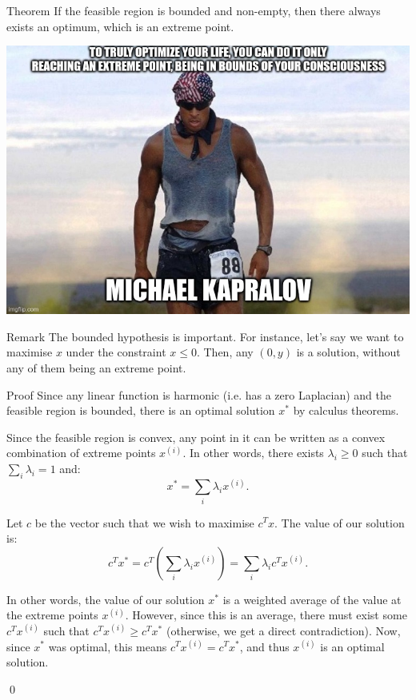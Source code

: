 \documentclass[a4paper]{article}
\begin{document}
\begin{parag}{Theorem}
    If the feasible region is bounded and non-empty, then there always exists an optimum, which is an extreme point.

    \begin{center}
        \includegraphics[width=\textwidth]{9hjhow.jpg}
    \end{center}


    \begin{subparag}{Remark}
        The bounded hypothesis is important. For instance, let's say we want to maximise $x$ under the constraint $x \leq 0$. Then, any $\left(0, y\right)$ is a solution, without any of them being an extreme point.
    \end{subparag}

    \begin{subparag}{Proof}
        Since any linear function is harmonic (i.e. has a zero Laplacian) and the feasible region is bounded, there is an optimal solution $x^*$ by calculus theorems.

        Since the feasible region is convex, any point in it can be written as a convex combination of extreme points $x^{\left(i\right)}$. In other words, there exists $\lambda_i \geq 0$ such that $\sum_{i} \lambda_i = 1$ and:
        \[x^* = \sum_{i} \lambda_i x^{\left(i\right)}.\]

        Let $c$ be the vector such that we wish to maximise $c^T x$. The value of our solution is:  
        \[c^T x^* = c^T \left(\sum_{i} \lambda_i x^{\left(i\right)}\right) = \sum_i \lambda_i c^T x^{\left(i\right)}.\]

        In other words, the value of our solution $x^*$ is a weighted average of the value at the extreme points $x^{\left(i\right)}$. However, since this is an average, there must exist some $c^T x^{\left(i\right)}$ such that $c^T x^{\left(i\right)} \geq c^T x^*$ (otherwise, we get a direct contradiction). Now, since $x^*$ was optimal, this means $c^T x^{\left(i\right)} = c^T x^*$, and thus $x^{\left(i\right)}$ is an optimal solution.

        \qed
    \end{subparag}
\end{parag}
\end{document}

